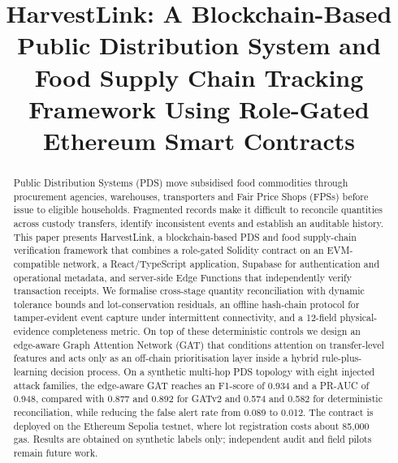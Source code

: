 \documentclass[conference,a4paper]{IEEEtran}
\begin{document}
\title{HarvestLink: A Blockchain-Based Public Distribution System and Food Supply Chain Tracking Framework Using Role-Gated Ethereum Smart Contracts}

\author{
}

\maketitle

\begin{abstract}
Public Distribution Systems (PDS) move subsidised food commodities through procurement agencies, warehouses, transporters and Fair Price Shops (FPSs) before issue to eligible households. Fragmented records make it difficult to reconcile quantities across custody transfers, identify inconsistent events and establish an auditable history. This paper presents HarvestLink, a blockchain-based PDS and food supply-chain verification framework that combines a role-gated Solidity contract on an EVM-compatible network, a React/TypeScript application, Supabase for authentication and operational metadata, and server-side Edge Functions that independently verify transaction receipts. We formalise cross-stage quantity reconciliation with dynamic tolerance bounds and lot-conservation residuals, an offline hash-chain protocol for tamper-evident event capture under intermittent connectivity, and a 12-field physical-evidence completeness metric. On top of these deterministic controls we design an edge-aware Graph Attention Network (GAT) that conditions attention on transfer-level features and acts only as an off-chain prioritisation layer inside a hybrid rule-plus-learning decision process. On a synthetic multi-hop PDS topology with eight injected attack families, the edge-aware GAT reaches an F1-score of 0.934 and a PR-AUC of 0.948, compared with 0.877 and 0.892 for GATv2 and 0.574 and 0.582 for deterministic reconciliation, while reducing the false alert rate from 0.089 to 0.012. The contract is deployed on the Ethereum Sepolia testnet, where lot registration costs about 85{,}000 gas. Results are obtained on synthetic labels only; independent audit and field pilots remain future work.
\end{abstract}
\end{document}
